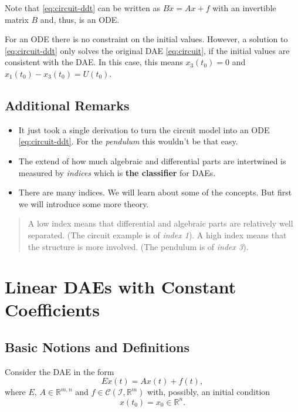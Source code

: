 \documentclass[]{book}
\newenvironment {JHSAYS} [0] {\begin{quote}\color{jhsc}} {\end{quote}}
\theoremstyle{definition}
\theoremstyle{definition}
\theoremstyle{definition}
\theoremstyle{definition}
\theoremstyle{remark}
\begin{document}
Note that \eqref{eq:circuit-ddt} can be written as \(B\dot x = Ax + f\) with an invertible matrix \(B\) and, thus, is an ODE.

For an ODE there is no constraint on the initial values. However, a solution to \eqref{eq:circuit-ddt} only solves the original DAE \eqref{eq:circuit}, if the initial values are consistent with the DAE. In this case, this means \(x_3(t_0)=0\) and \(x_1(t_0) - x_3(t_0) = U(t_0)\).

\hypertarget{additional-remarks}{%
\section{Additional Remarks}\label{additional-remarks}}

\begin{itemize}
\item
  It just took a single derivation to turn the circuit model into an ODE \eqref{eq:circuit-ddt}. For the \emph{pendulum} this wouldn't be that easy.
\item
  The extend of how much algebraic and differential parts are intertwined is measured by \emph{indices} which is \textbf{the classifier} for DAEs.
\item
  There are many indices. We will learn about some of the concepts. But first we will introduce some more theory.
\end{itemize}

\begin{JHSAYS}
A low index means that differential and algebraic parts are relatively
well separated. (The circuit example is of \emph{index 1}). A high index
means that the structure is more involved. (The pendulum is of
\emph{index 3}).
\end{JHSAYS}

\hypertarget{III}{%
\chapter{Linear DAEs with Constant Coefficients}\label{III}}

\hypertarget{basic-notions-and-definitions}{%
\section{Basic Notions and Definitions}\label{basic-notions-and-definitions}}

Consider the DAE in the form
\begin{equation}
E \dot x (t) = Ax(t) + f(t), \label{eq:gen-lin-cc-dae}
\end{equation}
where \(E\), \(A\in \mathbb R^{m,n}\) and \(f\in \mathcal C(\mathcal I, \mathbb R^m)\) with, possibly, an initial condition
\begin{equation}
x(t_0) = x_0 \in \mathbb R^{n}. \label{eq:gen-lin-cc-dae-inic}
\end{equation}
\end{document}
